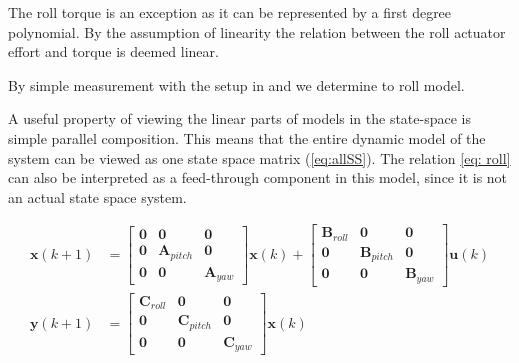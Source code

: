 The roll torque is an exception as it can be represented by a first degree polynomial. 
By the assumption of linearity the relation between the roll actuator effort and torque is deemed linear.


By simple measurement with the setup in  and  we determine to roll model.

A  useful property of viewing the linear parts of models in the state-space is simple parallel composition.
This means that the entire dynamic model of the system can be viewed as one state space matrix (\ref{eq:allSS}).
The relation \ref{eq: roll} can also be interpreted as a feed-through component in this model, since it is not an actual state space system.

\begin{align}\label{eq:allSS}
\mathbf{x}(k+1) &= 
\begin{bmatrix} \mathbf{0} & \mathbf{0} & \mathbf{0}\\
 \mathbf{0} & \mathbf{A}_{pitch} &\mathbf{0}\\
 \mathbf{0} &\mathbf{0} & \mathbf{A}_{yaw}  \end{bmatrix} 
 \mathbf{x}(k) + 
\begin{bmatrix} \mathbf{B}_{roll} & \mathbf{0} & \mathbf{0}\\
 \mathbf{0} & \mathbf{B}_{pitch} &\mathbf{0}\\
 \mathbf{0} &\mathbf{0} & \mathbf{B}_{yaw}  \end{bmatrix} 
 \mathbf{u}(k)\\
\mathbf{y}(k+1) &= 
\begin{bmatrix} \mathbf{C}_{roll} & \mathbf{0} & \mathbf{0}\\
 \mathbf{0} & \mathbf{C}_{pitch} &\mathbf{0}\\
 \mathbf{0} &\mathbf{0} & \mathbf{C}_{yaw}  \end{bmatrix} 
\mathbf{x}(k) 
\end{align}

